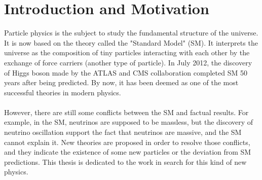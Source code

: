 \chapter{Introduction and Motivation}
Particle physics is the subject to study the fundamental structure of the universe. It is now based on the theory called the "Standard Model" (SM). It interprets the universe as the composition of tiny particles interacting with each other by the exchange of force carriers (another type of particle).  In July 2012, the discovery of Higgs boson made by the ATLAS and CMS collaboration \cite{HIGG-2012-27,CMS-HIG-12-028} completed SM 50 years after being predicted. By now, it has been deemed as one of the most successful theories in modern physics.
\\
\\
However, there are still some conflicts between the SM and factual results. For example, in the SM, neutrinos are supposed to be massless, but the discovery of neutrino oscillation support the fact that neutrinos are massive, and the SM cannot explain it. New theories are proposed in order to resolve those conflicts, and they indicate the existence of some new particles or the deviation from SM predictions. This thesis is dedicated to the work in search for this kind of new physics.  
